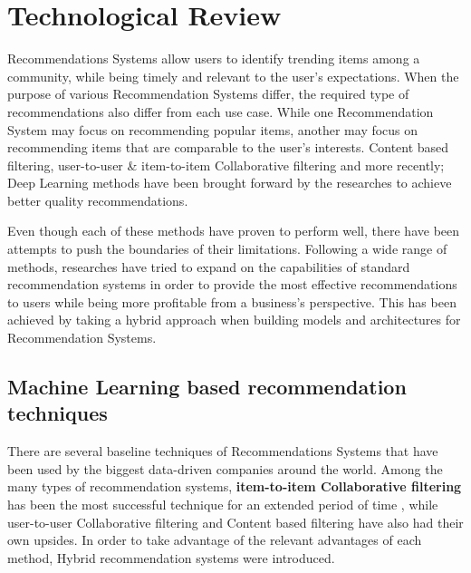 

\section{Technological Review}

Recommendations Systems allow users to identify trending items among a community, while being timely and relevant to the user's expectations. When the purpose of various Recommendation Systems differ, the required type of recommendations also differ from each use case. While one Recommendation System may focus on recommending popular items, another may focus on recommending items that are comparable to the user's interests. Content based filtering, user-to-user \& item-to-item Collaborative filtering and more recently; Deep Learning methods have been brought forward by the researches to achieve better quality recommendations.

Even though each of these methods have proven to perform well, there have been attempts to push the boundaries of their limitations. Following a wide range of methods, researches have tried to expand on the capabilities of standard recommendation systems in order to provide the most effective recommendations to users while being more profitable from a business's perspective. This has been achieved by taking a hybrid approach when building models and architectures for Recommendation Systems.

\subsection{Machine Learning based recommendation techniques}
There are several baseline techniques of Recommendations Systems that have been used by the biggest data-driven companies around the world.
Among the many types of recommendation systems, \textbf{item-to-item Collaborative filtering} \autocite{linden_amazoncom_2003} has been the most successful technique for an extended period of time \autocite{smith_two_2017}, while user-to-user Collaborative filtering and Content based filtering have also had their own upsides. In order to take advantage of the relevant advantages of each method, Hybrid recommendation systems \autocite{geetha_hybrid_2018} were introduced. 

